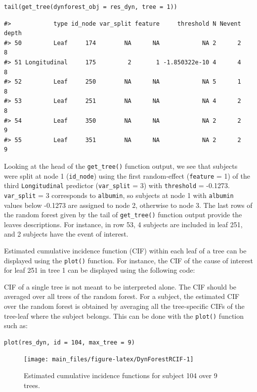 \begin{verbatim}
tail(get_tree(dynforest_obj = res_dyn, tree = 1))
\end{verbatim}

\begin{verbatim}
#>            type id_node var_split feature     threshold N Nevent depth
#> 50         Leaf     174        NA      NA            NA 2      2     8
#> 51 Longitudinal     175         2       1 -1.850322e-10 4      4     8
#> 52         Leaf     250        NA      NA            NA 5      1     8
#> 53         Leaf     251        NA      NA            NA 4      2     8
#> 54         Leaf     350        NA      NA            NA 2      2     9
#> 55         Leaf     351        NA      NA            NA 2      2     9
\end{verbatim}

\noindent Looking at the head of the \texttt{get\_tree()} function output, we see that subjects were split at node 1 (\texttt{id\_node}) using the first random-effect (\texttt{feature} = 1) of the third \texttt{Longitudinal} predictor (\texttt{var\_split} = 3) with \texttt{threshold} = -0.1273. \texttt{var\_split} = 3 corresponds to \texttt{albumin}, so subjects at node 1 with \texttt{albumin} values below -0.1273 are assigned to node 2, otherwise to node 3. The last rows of the random forest given by the tail of \texttt{get\_tree()} function output provide the leaves descriptions. For instance, in row 53, 4 subjects are included in leaf 251, and 2 subjects have the event of interest.

Estimated cumulative incidence function (CIF) within each leaf of a tree can be displayed using the \texttt{plot()} function. For instance, the CIF of the cause of interest for leaf 251 in tree 1 can be displayed using the following code:

CIF of a single tree is not meant to be interpreted alone. The CIF should be averaged over all trees of the random forest. For a subject, the estimated CIF over the random forest is obtained by averaging all the tree-specific CIFs of the tree-leaf where the subject belongs. This can be done with the \texttt{plot()} function such as:

\begin{verbatim}
plot(res_dyn, id = 104, max_tree = 9)
\end{verbatim}

\begin{figure}

{\centering \texttt{[image: main\_files/figure-latex/DynForestRCIF-1]}

}

\caption{Estimated cumulative incidence functions for subject 104 over 9 trees.}\label{fig:DynForestRCIF}
\end{figure}

